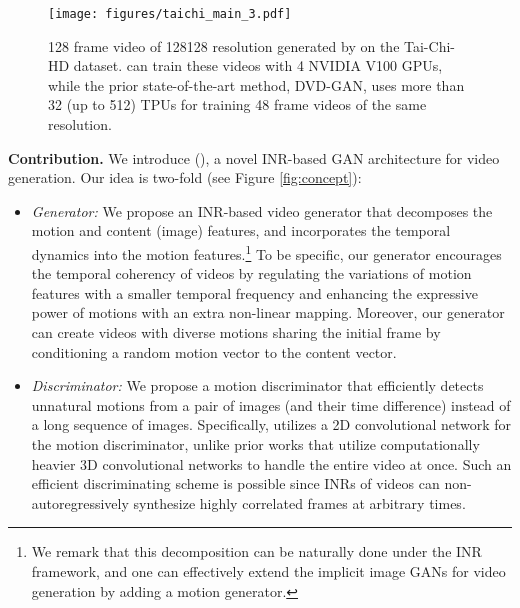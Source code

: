 \documentclass{article} \usepackage{iclr2022_conference,times}
\begin{document}
\begin{figure*}[t]
\vspace{-0.1in}
\begin{center}
\texttt{[image: figures/taichi\_main\_3.pdf]}
\end{center}
\vspace{-0.15in}
\caption{
128 frame video of 128128 resolution generated by \sname on the Tai-Chi-HD dataset. 
\sname can train
these videos with 4 NVIDIA V100 GPUs, while the prior state-of-the-art method, DVD-GAN, uses more than 32 (up to 512) TPUs for training 48 frame videos of the same resolution.
}\label{fig:intro}
\vspace{-0.1in}
\end{figure*}

 
\textbf{Contribution.} 
We introduce \emph{\lname} (\sname), a novel INR-based GAN architecture for video generation. Our idea is two-fold (see Figure \ref{fig:concept}):
\begin{itemize}[topsep=0.0pt,itemsep=1.0pt,leftmargin=5.5mm]
    \item \emph{Generator:}
    We propose an INR-based video generator that decomposes the motion and content (image) features, and incorporates the temporal dynamics into the motion features.\footnote{We remark that this decomposition can be naturally done under the INR framework, and one can effectively extend the implicit image GANs for video generation by adding a motion generator.}
    To be specific, our generator encourages the temporal coherency of videos by regulating the variations of motion features with a smaller temporal frequency and enhancing the expressive power of motions with an extra non-linear mapping. Moreover, our generator can create videos with diverse motions sharing the initial frame by conditioning a random motion vector to the content vector.

    \item \emph{Discriminator:} 
    We propose a motion discriminator that efficiently detects unnatural motions from a pair of images (and their time difference) instead of a long sequence of images. Specifically, \sname utilizes a 2D convolutional network for the motion discriminator, unlike prior works that utilize computationally heavier 3D convolutional networks to handle the entire video at once. Such an efficient discriminating scheme is possible since INRs of videos can non-autoregressively synthesize highly correlated frames at arbitrary times.
\end{itemize}
\end{document}
